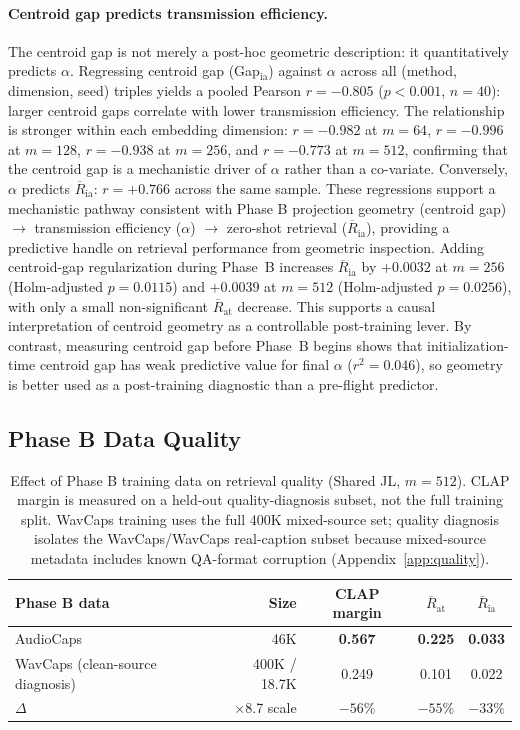 \documentclass{article}
\newcommand{\avgR}{\overline{R}}
\begin{document}
\paragraph{Centroid gap predicts transmission efficiency.}
The centroid gap is not merely a post-hoc geometric description: it quantitatively predicts $\alpha$.
Regressing centroid gap (Gap$_\mathrm{ia}$) against $\alpha$ across all (method, dimension, seed) triples yields a pooled Pearson $r = -0.805$ ($p < 0.001$, $n = 40$): larger centroid gaps correlate with lower transmission efficiency.
The relationship is stronger within each embedding dimension: $r = -0.982$ at $m=64$, $r = -0.996$ at $m=128$, $r = -0.938$ at $m=256$, and $r = -0.773$ at $m=512$, confirming that the centroid gap is a mechanistic driver of $\alpha$ rather than a co-variate.
Conversely, $\alpha$ predicts $\avgR_\mathrm{ia}$: $r = +0.766$ across the same sample.
These regressions support a mechanistic pathway consistent with Phase B projection geometry (centroid gap) $\to$ transmission efficiency ($\alpha$) $\to$ zero-shot retrieval ($\avgR_\mathrm{ia}$), providing a predictive handle on retrieval performance from geometric inspection.
Adding centroid-gap regularization during Phase~B increases $\avgR_\mathrm{ia}$ by $+0.0032$ at $m=256$ (Holm-adjusted $p=0.0115$) and $+0.0039$ at $m=512$ (Holm-adjusted $p=0.0256$), with only a small non-significant $\avgR_\mathrm{at}$ decrease.
This supports a causal interpretation of centroid geometry as a controllable post-training lever.
By contrast, measuring centroid gap before Phase~B begins shows that initialization-time centroid gap has weak predictive value for final $\alpha$ ($r^2=0.046$), so geometry is better used as a post-training diagnostic than a pre-flight predictor.

\subsection{Phase B Data Quality}
\label{sec:dataquality}

\begin{table}[tbp]
  \caption{Effect of Phase B training data on retrieval quality (Shared JL, $m=512$).
  CLAP margin is measured on a held-out quality-diagnosis subset, not the full training split.
  WavCaps training uses the full 400K mixed-source set; quality diagnosis isolates the
  WavCaps/WavCaps real-caption subset because mixed-source metadata includes known QA-format corruption (Appendix~\ref{app:quality}).}
  \label{tab:dataquality}
  \centering
  \footnotesize
  \begin{tabular}{p{5.2cm}rccc}
    \toprule
    Phase B data & Size & CLAP margin & $\avgR_\mathrm{at}$ & $\avgR_\mathrm{ia}$ \\
    \midrule
    AudioCaps \citep{kim2019audiocaps} & 46K & \bf{0.567} & \bf{0.225} & \bf{0.033} \\
    WavCaps \citep{mei2023wavcaps} (clean-source diagnosis) & 400K / 18.7K & 0.249 & 0.101 & 0.022 \\
    $\Delta$ & $\times$8.7 scale & $-56\%$ & $-55\%$ & $-33\%$ \\
    \bottomrule
  \end{tabular}
\end{table}
\end{document}
